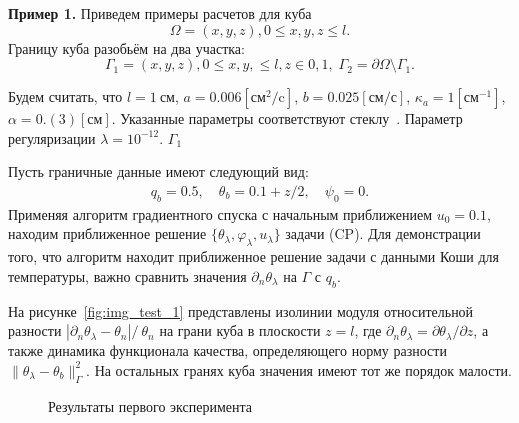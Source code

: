 \textbf{Пример 1.}
Приведем примеры расчетов для куба
\[
    \Omega = {(x, y, z), 0 \leq x,y,z \leq l}.
\]
Границу куба разобьём на два участка:
\[
    \Gamma_1 = {(x, y, z), 0 \leq x,y, \leq l, z \in {0, 1}}, \;
    \Gamma_2 = \partial \Omega \setminus \Gamma_1.
\]

Будем считать, что $l=1~\text{см}$, $a = 0.006[\text{см}^2/\text{c}]$,
$b=0.025[\text{см}/\text{с}]$,
$\kappa_a=1[\text{см}^{-1}]$, $\alpha = 0.(3)[\text{см}]$.
Указанные параметры соответствуют стеклу~\cite{Grenkin5}.
Параметр регуляризации $\lambda=10^{-12}.$ $\Gamma_1$

Пусть граничные данные имеют следующий вид:
\begin{gather*}
    q_b = 0.5, \quad
    \theta_b = 0.1 + z/2, \quad
    \psi_0 = 0.
\end{gather*}
Применяя алгоритм градиентного спуска
с начальным приближением $u_0 = 0.1$, находим приближенное решение
$\{\theta_\lambda,\varphi_\lambda,u_\lambda\}$ задачи (CP)\@.
Для демонстрации того, что алгоритм находит приближенное решение задачи с данными
Коши для температуры, важно сравнить значения $\partial_n\theta_\lambda$ на $\Gamma$ с $q_b.$

На рисунке~\ref{fig:img_test_1} представлены изолинии модуля относительной разности
$|\partial_n\theta_\lambda-\theta_n|/\ \theta_n$
на грани куба в плоскости $z=l$, где
$\partial_n\theta_\lambda=\partial\theta_\lambda/\partial z$,
а также динамика функционала качества, определяющего
норму разности $\|\theta_\lambda -\theta_b\|^2_\Gamma$.
На остальных гранях куба значения имеют тот же порядок малости.

\begin{figure}[H]
    \centering
    \caption{Результаты первого эксперимента}
    \label{fig:1}
\end{figure}
